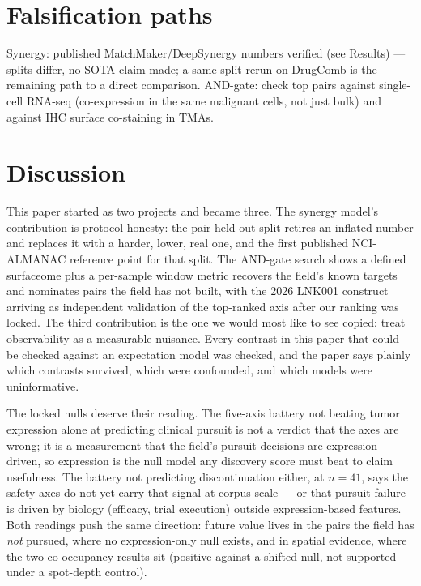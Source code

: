 \documentclass[11pt]{article}
\begin{document}
\section{Falsification paths}
Synergy: published MatchMaker/DeepSynergy numbers verified (see Results) --- splits differ, no SOTA claim made; a same-split rerun on DrugComb is the remaining path to a direct comparison. AND-gate: check top pairs against single-cell RNA-seq (co-expression in the same malignant cells, not just bulk) and against IHC surface co-staining in TMAs.
\section{Discussion}
This paper started as two projects and became three. The synergy model's
contribution is protocol honesty: the pair-held-out split retires an
inflated number and replaces it with a harder, lower, real one, and the first
published NCI-ALMANAC reference point for that split. The AND-gate search
shows a defined surfaceome plus a per-sample window metric recovers the
field's known targets and nominates pairs the field has not built, with the
2026 LNK001 construct arriving as independent validation of the top-ranked
axis after our ranking was locked. The third contribution is the one we would
most like to see copied: treat observability as a measurable nuisance. Every
contrast in this paper that could be checked against an expectation model was
checked, and the paper says plainly which contrasts survived, which were
confounded, and which models were uninformative.

The locked nulls deserve their reading. The five-axis battery not beating
tumor expression alone at predicting clinical pursuit is not a verdict that
the axes are wrong; it is a measurement that the field's pursuit decisions
are expression-driven, so expression is the null model any discovery score
must beat to claim usefulness. The battery not predicting discontinuation
either, at $n=41$, says the safety axes do not yet carry that signal at
corpus scale --- or that pursuit failure is driven by biology (efficacy,
trial execution) outside expression-based features. Both readings push the
same direction: future value lives in the pairs the field has \emph{not}
pursued, where no expression-only null exists, and in spatial evidence,
where the two co-occupancy results sit (positive against a shifted null, not supported under a spot-depth control).
\end{document}
